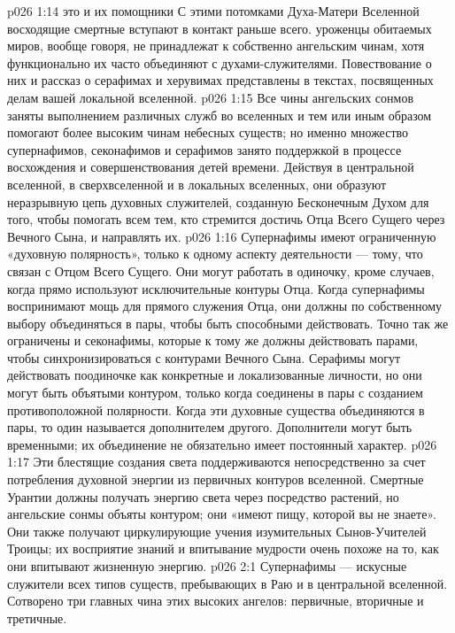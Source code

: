\vs p026 1:14 \bibnobreakspace {} это  и их помощники  С этими потомками Духа\hyp{}Матери Вселенной восходящие смертные вступают в контакт раньше всего.  уроженцы обитаемых миров, вообще говоря, не принадлежат к собственно ангельским чинам, хотя функционально их часто объединяют с духами\hyp{}служителями. Повествование о них и рассказ о серафимах и херувимах представлены в текстах, посвященных делам вашей локальной вселенной.
\vs p026 1:15 \pc Все чины ангельских сонмов заняты выполнением различных служб во вселенных и тем или иным образом помогают более высоким чинам небесных существ; но именно множество супернафимов, секонафимов и серафимов занято поддержкой в процессе восхождения и совершенствования детей времени. Действуя в центральной вселенной, в сверхвселенной и в локальных вселенных, они образуют неразрывную цепь духовных служителей, созданную Бесконечным Духом для того, чтобы помогать всем тем, кто стремится достичь Отца Всего Сущего через Вечного Сына, и направлять их.
\vs p026 1:16 Супернафимы имеют ограниченную «духовную полярность», только к одному аспекту деятельности --- тому, что связан с Отцом Всего Сущего. Они могут работать в одиночку, кроме случаев, когда прямо используют исключительные контуры Отца. Когда супернафимы воспринимают мощь для прямого служения Отца, они должны по собственному выбору объединяться в пары, чтобы быть способными действовать. Точно так же ограничены и секонафимы, которые к тому же должны действовать парами, чтобы синхронизироваться с контурами Вечного Сына. Серафимы могут действовать поодиночке как конкретные и локализованные личности, но они могут быть объятыми контуром, только когда соединены в пары с созданием противоположной полярности. Когда эти духовные существа объединяются в пары, то один называется дополнителем другого. Дополнители могут быть временными; их объединение не обязательно имеет постоянный характер.
\vs p026 1:17 Эти блестящие создания света поддерживаются непосредственно за счет потребления духовной энергии из первичных контуров вселенной. Смертные Урантии должны получать энергию света через посредство растений, но ангельские сонмы объяты контуром; они «имеют пищу, которой вы не знаете». Они также получают циркулирующие учения изумительных Сынов\hyp{}Учителей Троицы; их восприятие знаний и впитывание мудрости очень похоже на то, как они впитывают жизненную энергию.
\vs p026 2:1 Супернафимы --- искусные служители всех типов существ, пребывающих в Раю и в центральной вселенной. Сотворено три главных чина этих высоких ангелов: первичные, вторичные и третичные.
